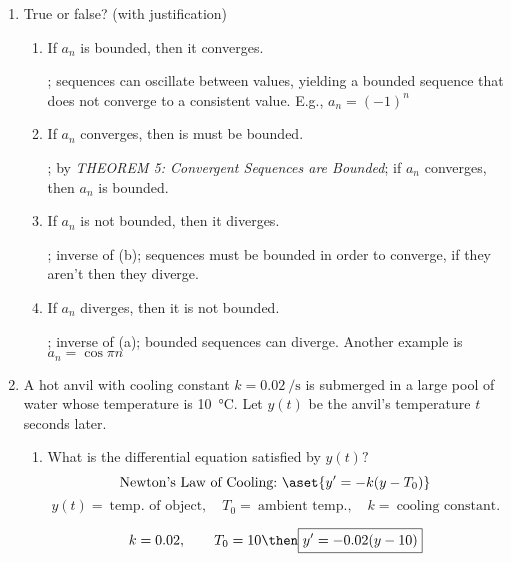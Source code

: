\documentclass{nosvagor-notes}
\begin{document}
\begin{enumerate}
  \item True or false? (with justification)
  \begin{enumerate}
    \item If \({a_n}\) is bounded, then it converges.

      ; sequences can oscillate between values, yielding a bounded sequence that does not converge to a consistent value. E.g., \(a_n = (-1)^{n}\)
      \vspace{90pt}

    \item If \({a_n}\) converges, then is must be bounded.

      ; by \textit{THEOREM 5: Convergent Sequences are Bounded}; if
      \({a_n}\) converges, then \({a_n} \) is bounded.
      \vspace{90pt}

    \item If \({a_n}\) is not bounded, then it diverges.

      ;  inverse of (b); sequences must be bounded in order to
      converge, if they aren't then they diverge.
      \vspace{90pt}

    \item If \({a_n}\) diverges, then it is not bounded.

      ;  inverse of (a); bounded sequences can diverge. Another example is \(a_n = \cos \pi n\)
      \vspace{30pt}
  \end{enumerate}

  \newpage

 \item A hot anvil with cooling constant \(k = \SI{0.02}{\per\second}\) is
   submerged in a large pool of water whose temperature is \SI{10}{\celsius}.
   Let \(y(t)\) be the anvil’s temperature \(t\) seconds later.
   \begin{enumerate}
     \item What is the differential equation satisfied by \(y(t)?\)
       \[%
         \text{Newton's Law of Cooling:}~ \aset{y' = -k(y - T_0)}
       \]%
       \[%
        y(t) = ~\text{temp. of object}, \quad T_0 = ~\text{ambient temp.}, \quad k = ~\text{cooling constant}.
       \]%

       \[%
         k = 0.02, \qquad T_0 = 10 \then \boxed{y' = -0.02(y - 10)}
       \]%
       \vspace{90pt}


\end{enumerate}
\end{enumerate}
\end{document}
